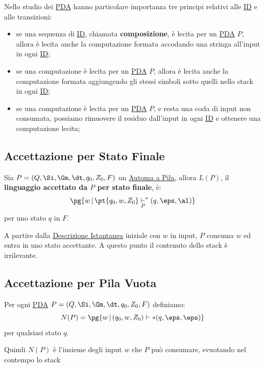\begin{note}
    Nello studio dei \hyperref[def:pda]{PDA} hanno particolare importanza tre principi relativi alle \hyperref[def:desc-inst]{ID} e alle transizioni:
    \begin{itemize}
        \item se una sequenza di \hyperref[def:desc-inst]{ID}, chiamata \textbf{composizione}, è lecita per un \hyperref[def:pda]{PDA} $P$, allora è lecita anche la computazione formata accodando una stringa all'input in ogni \hyperref[def:desc-inst]{ID};
        \item se una computazione è lecita per un \hyperref[def:pda]{PDA} $P$, allora è lecita anche la computazione formata aggiungendo gli stessi simboli sotto quelli nello stack in ogni \hyperref[def:desc-inst]{ID};
        \item se una computazione è lecita per un \hyperref[def:pda]{PDA} $P$, e resta una coda di input non consumata, possiamo rimuovere il residuo dall'input in ogni \hyperref[def:desc-inst]{ID} e ottenere una computazione lecita;
    \end{itemize}
\end{note}
%
\subsection{Accettazione per Stato Finale}\label{sub:ll_accettazione_per_stato_finale} %
Sia $P = (Q,\Si,\Gm,\dt,q_0,Z_0,F)$ un \hyperref[def:pda]{Automa a Pila}, allora $L(P)$, il \textbf{linguaggio accettato da $P$ per stato finale}, è:
\[
    \pg{w\,|\,\pt{q_0,w,Z_0} \underset{P}{\vdash}^* (q,\eps,\al)}
\]
per uno stato $q$ in $F$.
\begin{note}
    A partire dalla \hyperref[def:desc-inst]{Descrizione Istantanea} iniziale con $w$ in input, $P$ consuma $w$ ed entra in uno stato accettante.
    A questo punto il contenuto dello stack è irrilevante.
\end{note}
%
\subsection{Accettazione per Pila Vuota}\label{sub:ll_accettazione_per_pila_vuota} %
Per ogni \hyperref[def:pda]{PDA} $P = (Q,\Si,\Gm,\dt,q_0,Z_0,F)$ definiamo:
\[
    N(P) = \pg{w\,|\,(q_0,w,Z_0)\vdash* (q,\eps,\eps)}
\]
per qualsiasi stato $q$.
\begin{note}
    Quindi $N(P)$ è l'insieme degli input $w$ che $P$ può consumare, svuotando nel contempo lo stack
\end{note}
%
